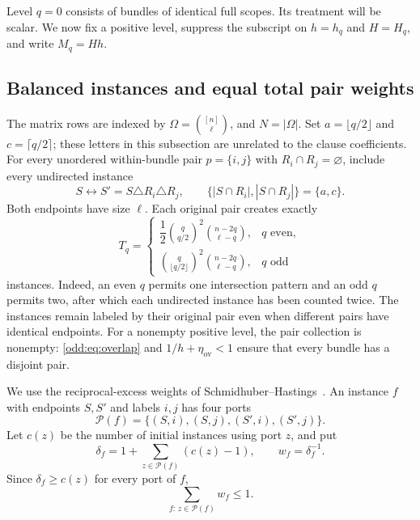 \documentclass[letterpaper,11pt]{article}
\theoremstyle{definition}
\begin{document}
Level $q=0$ consists of bundles of identical full scopes.  Its treatment
will be scalar.  We now fix a positive level, suppress the subscript on
$h=h_q$ and $H=H_q$, and write $M_q=Hh$.

\subsection{Balanced instances and equal total pair weights}

The matrix rows are indexed by $\Omega=\binom{[n]}\ell$, and
$N=|\Omega|$.  Set $a=\lfloor q/2\rfloor$ and $c=\lceil q/2\rceil$;
these letters in this subsection are unrelated to the clause coefficients.
For every unordered within-bundle pair $p=\{i,j\}$ with
$R_i\cap R_j=\varnothing$, include every undirected instance
\begin{equation}\label{odd:eq:balanced-move}
 S\longleftrightarrow S'=S\triangle R_i\triangle R_j,
 \qquad \{|S\cap R_i|,|S\cap R_j|\}=\{a,c\}.
\end{equation}
Both endpoints have size $\ell$.  Each original pair creates exactly
\begin{equation}\label{odd:eq:instance-count}
 T_q=
 \begin{cases}
 \dfrac12\binom q{q/2}^{\!2}\binom{n-2q}{\ell-q},&q\text{ even},\\[4pt]
 \binom q{\lfloor q/2\rfloor}^{\!2}\binom{n-2q}{\ell-q},&q\text{ odd}
 \end{cases}
\end{equation}
instances.  Indeed, an even $q$ permits one intersection pattern and an
odd $q$ permits two, after which each undirected instance has been counted
twice.  The instances remain labeled by their original pair even when
different pairs have identical endpoints.
For a nonempty positive level, the pair collection is nonempty:
\eqref{odd:eq:overlap} and $1/h+\eta_{\mathrm{ov}}<1$ ensure that every
bundle has a disjoint pair.

We use the reciprocal-excess weights of
Schmidhuber--Hastings~\cite[Section~3.2]{SH26Moore}.  An instance $f$ with
endpoints $S,S'$ and labels $i,j$ has four ports
\[
 \mathcal P(f)=\{(S,i),(S,j),(S',i),(S',j)\}.
\]
Let $c(z)$ be the number of initial instances using port $z$, and put
\begin{equation}\label{odd:eq:port-weight}
 \delta_f=1+\sum_{z\in\mathcal P(f)}(c(z)-1),\qquad
 w_f=\delta_f^{-1}.
\end{equation}
Since $\delta_f\geq c(z)$ for every port of $f$,
\begin{equation}\label{odd:eq:port-capacity}
 \sum_{f:\,z\in\mathcal P(f)}w_f\leq1.
\end{equation}
\end{document}
